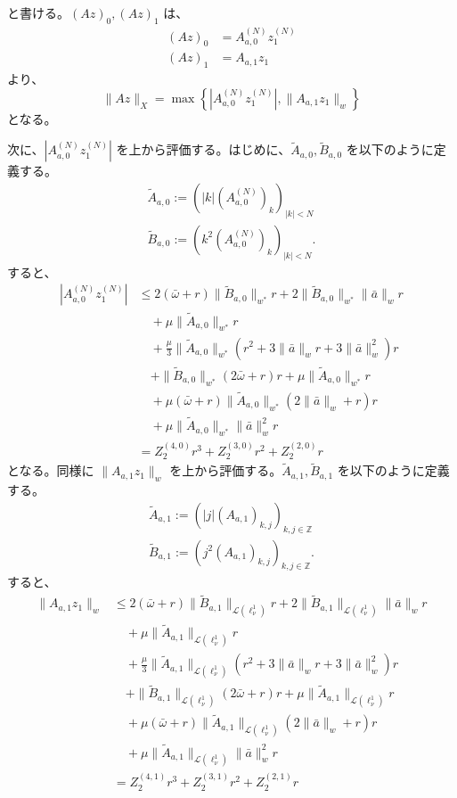 と書ける。$(Az)_0, (Az)_1$ は、
\begin{align*}
    (Az)_0 &= A_{a,0}^{(N)} z_1^{(N)} \\
    (Az)_1 &= A_{a,1}z_1
\end{align*}
より、
$$
    \| Az \|_X = \max \left\{ |A_{a,0}^{(N)}z_1^{(N)}|, \| A_{a,1}z_1 \|_w \right\}
$$
となる。

次に、$|A_{a,0}^{(N)}z_1^{(N)}|$ を上から評価する。はじめに、$\tilde{A}_{a,0},\tilde{B}_{a,0}$ を以下のように定義する。
\begin{align*}
    \tilde{A}_{a,0} := (|k| (A_{a,0}^{(N)})_k )_{|k| < N} \\
    \tilde{B}_{a,0} := (k^2 (A_{a,0}^{(N)})_k )_{|k| < N}.
\end{align*}
すると、
\begin{align*}
|A_{a,0}^{(N)}z_1^{(N)}| &\leq 2 (\bar{\omega} + r) \|\tilde{B}_{a,0}\|_{w^*} r + 2 \|\tilde{B}_{a,0}\|_{w^*} \|\bar{a}\|_w r \\
    &\quad + \mu \|\tilde{A}_{a,0}\|_{w^*} r \\
    &\quad + \frac{\mu}{3} \|\tilde{A}_{a,0}\|_{w^*} (r^2 + 3 \|\bar{a}\|_w r + 3 \|\bar{a}\|^2_w )r \\
    &\quad + \|\tilde{B}_{a,0}\|_{w^*} (2 \bar{\omega} + r) r + \mu \|\tilde{A}_{a,0}\|_{w^*} r \\
    &\quad + \mu (\bar{\omega} + r) \|\tilde{A}_{a,0}\|_{w^*} (2 \|\bar{a}\|_w + r) r \\
    &\quad + \mu \|\tilde{A}_{a,0}\|_{w^*} \|\bar{a}\|^2_w r \\
    &= Z_2^{(4,0)} r^3 + Z_2^{(3,0)} r^2 + Z_2^{(2,0)} r
\end{align*}
となる。同様に $\| A_{a,1} z_1 \|_w$ を上から評価する。$\tilde{A}_{a,1},\tilde{B}_{a,1}$ を以下のように定義する。
\begin{align*}
    \tilde{A}_{a,1} := (|j| (A_{a,1})_{k,j} )_{k,j \in \mathbb{Z}} \\
    \tilde{B}_{a,1} := (j^2 (A_{a,1})_{k,j} )_{k,j \in \mathbb{Z}}.
\end{align*}
すると、 
\begin{align*}
    \| A_{a,1} z_1 \|_w &\leq  2 (\bar{\omega} + r) \|\tilde{B}_{a,1}\|_{\mathcal{L}(\ell^1_\nu)} r + 2 \|\tilde{B}_{a,1}\|_{\mathcal{L}(\ell^1_\nu)} \|\bar{a}\|_w r \\
   &\quad + \mu \|\tilde{A}_{a,1}\|_{\mathcal{L}(\ell^1_\nu)} r \\
   &\quad+ \frac{\mu}{3} \|\tilde{A}_{a,1}\|_{\mathcal{L}(\ell^1_\nu)} (r^2 + 3 \|\bar{a}\|_w r + 3 \|\bar{a}\|^2_w )r \\
   &\quad + \|\tilde{B}_{a,1}\|_{\mathcal{L}(\ell^1_\nu)} (2 \bar{\omega} + r) r + \mu \|\tilde{A}_{a,1}\|_{\mathcal{L}(\ell^1_\nu)} r \\
   &\quad+ \mu (\bar{\omega} + r) \|\tilde{A}_{a,1}\|_{\mathcal{L}(\ell^1_\nu)} (2 \|\bar{a}\|_w + r) r \\
   &\quad + \mu \|\tilde{A}_{a,1}\|_{\mathcal{L}(\ell^1_\nu)} \|\bar{a}\|^2_w r \\
    &= Z_2^{(4,1)} r^3 + Z_2^{(3,1)} r^2 + Z_2^{(2,1)} r
\end{align*}
